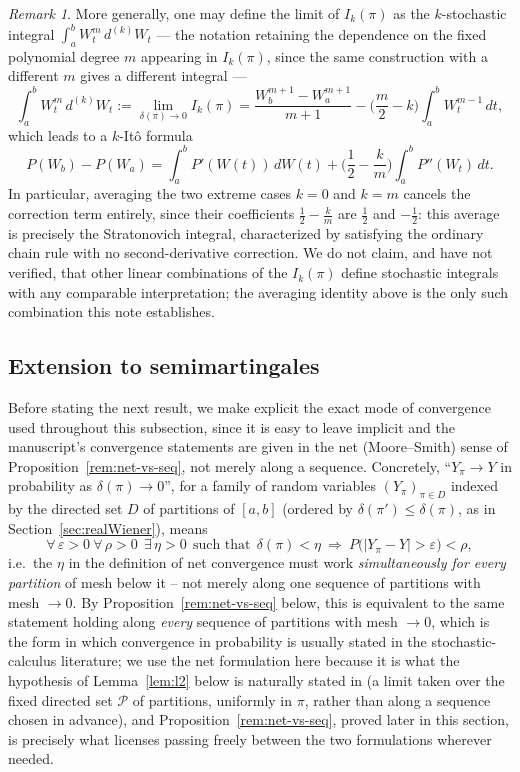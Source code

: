 \documentclass[11pt,fleqn]{article}
\newcommand{\eps}{\varepsilon}
\theoremstyle{plain}
\theoremstyle{remark}
\newtheorem{remark}[thm]{Remark}
\begin{document}
\begin{remark}
More generally, one may define the limit of $I_k(\pi)$ as the
$k$-stochastic integral $\int_a^bW_t^m\,d^{(k)}W_t$ --- the notation
retaining the dependence on the fixed polynomial degree $m$ appearing in
$I_k(\pi)$, since the same construction with a different $m$ gives a
different integral ---
\[
\int_a^bW_t^m\,d^{(k)}W_t:=\lim_{\delta(\pi)\to0}I_k(\pi)
=\frac{W_b^{m+1}-W_a^{m+1}}{m+1}-\Big(\frac m2-k\Big)\int_a^bW_t^{m-1}\,dt,
\]
which leads to a $k$-It\^o formula
\[
P(W_b)-P(W_a)=\int_a^bP'(W(t))\,dW(t)+\Big(\frac12-\frac km\Big)\int_a^bP''(W_t)\,dt.
\]
In particular, averaging the two extreme cases $k=0$ and $k=m$ cancels
the correction term entirely, since their coefficients $\tfrac12-\tfrac
km$ are $\tfrac12$ and $-\tfrac12$: this average is precisely the
Stratonovich integral, characterized by satisfying the ordinary chain
rule with no second-derivative correction. We do not claim, and have not
verified, that other linear combinations of the $I_k(\pi)$ define
stochastic integrals with any comparable interpretation; the averaging
identity above is the only such combination this note establishes.
\end{remark}

\subsection{Extension to semimartingales}

Before stating the next result, we make explicit the exact mode of
convergence used throughout this subsection, since it is easy to leave
implicit and the manuscript's convergence statements are given in the
net (Moore--Smith) sense of Proposition~\ref{rem:net-vs-seq}, not merely
along a sequence. Concretely, ``$Y_\pi\to Y$ in probability as
$\delta(\pi)\to0$'', for a family of random variables $(Y_\pi)_{\pi\in
D}$ indexed by the directed set $D$ of partitions of $[a,b]$ (ordered
by $\delta(\pi')\le\delta(\pi)$, as in Section~\ref{sec:realWiener}),
means
\[
\forall\,\eps>0\ \forall\,\rho>0\ \ \exists\,\eta>0\ \ \text{such that}\ \
\delta(\pi)<\eta\ \Longrightarrow\ P\big(|Y_\pi-Y|>\eps\big)<\rho,
\]
i.e.\ the $\eta$ in the definition of net convergence must work
\emph{simultaneously for every partition} of mesh below it -- not merely
along one sequence of partitions with mesh $\to0$. By
Proposition~\ref{rem:net-vs-seq} below, this is equivalent to the same
statement holding along \emph{every} sequence of partitions with mesh
$\to0$, which is the form in which convergence in probability is usually
stated in the stochastic-calculus literature; we use the net formulation
here because it is what the hypothesis of Lemma~\ref{lem:l2} below is
naturally stated in (a limit taken over the fixed directed set
$\mathcal P$ of partitions, uniformly in $\pi$, rather than along a
sequence chosen in advance), and Proposition~\ref{rem:net-vs-seq},
proved later in this section, is precisely what licenses passing freely
between the two formulations wherever needed.
\end{document}
